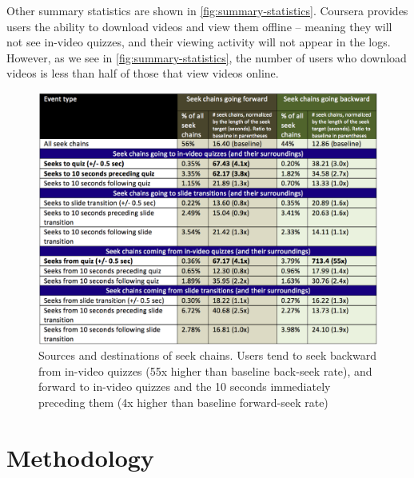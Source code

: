 \documentclass{sigchi}
\begin{document}
Other summary statistics are shown in \autoref{fig:summary-statistics}. Coursera provides users the ability to download videos and view them offline -- meaning they will not see in-video quizzes, and their viewing activity will not appear in the logs. However, as we see in \autoref{fig:summary-statistics}, the number of users who download videos is less than half of those that view videos online. 


\begin{figure}
\includegraphics[width=1.0\columnwidth]{seek-sources-and-destinations-table}
\caption{Sources and destinations of seek chains. Users tend to seek backward from in-video quizzes (55x higher than baseline back-seek rate), and forward to in-video quizzes and the 10 seconds immediately preceding them (4x higher than baseline forward-seek rate)}
\label{fig:seek-sources-and-destinations-table}
\end{figure}

\section{Methodology}
\end{document}
